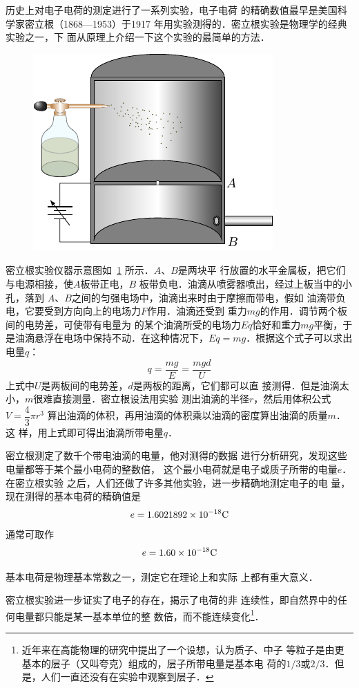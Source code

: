 历史上对电子电荷的测定进行了一系列实验，电子电荷
的精确数值最早是美国科学家密立根（1868—1953）于1917
年用实验测得的．密立根实验是物理学的经典实验之一，下
面从原理上介绍一下这个实验的最简单的方法．

\begin{figure}[htbp]
    \centering
    \includegraphics{fig/B/6-31.pdf}
    \caption{}\label{fig_B_6-31}
\end{figure}

密立根实验仪器示意图如~\ref{fig_B_6-31} 所示．$A$、$B$是两块平
行放置的水平金属板，把它们与电源相接，使$A$板带正电，$B$
板带负电．油滴从喷雾器喷出，经过上板当中的小孔，落到
$A$、$B$之间的匀强电场中，油滴出来时由于摩擦而带电，假如
油滴带负电，它要受到方向向上的电场力$F$作用．油滴还受到
重力$mg$的作用．调节两个板间的电势差，可使带有电量为
的某个油滴所受的电场力$Eq$恰好和重力$mg$平衡，于是油滴悬浮在电场中保持不动．在这种情况下，$Eq=
mg$．根据这个式子可以求出电量$q$：
\[q=\frac{mg}{E}=\frac{mgd}{U}  \]
上式中$U$是两板间的电势差，$d$是两板的距离，它们都可以直
接测得．但是油滴太小，$m$很难直接测量．密立根设法用实验
测出油滴的半径$r$，然后用体积公式$V=\dfrac{4}{3}\pi r^3$
算出油滴的体积，再用油滴的体积乘以油滴的密度算出油滴的质量$m$．这
样，用上式即可得出油滴所带电量$q$．

密立根测定了数千个带电油滴的电量，他对测得的数据
进行分析研究，发现这些电量都等于某个最小电荷的整数倍，
这个最小电荷就是电子或质子所带的电量$e$．在密立根实验
之后，人们还做了许多其他实验，进一步精确地测定电子的电
量，现在测得的基本电荷的精确值是
\[e=1.6021892\times10^{-18}{\rm C}\]
通常可取作
\[e=1.60\times10^{-18}{\rm C}\]

基本电荷是物理基本常数之一，测定它在理论上和实际
上都有重大意义．

密立根实验进一步证实了电子的存在，揭示了电荷的非
连续性，即自然界中的任何电量都只能是某一基本单位的整
数倍，而不能连续变化\footnote{近年来在高能物理的研究中提出了一个设想，认为质子、中子
等粒子是由更基本的层子（又叫夸克）组成的，层子所带电量是基本电
荷的$1/3$或$2/3$．但是，人们一直还没有在实验中观察到层子．}．

